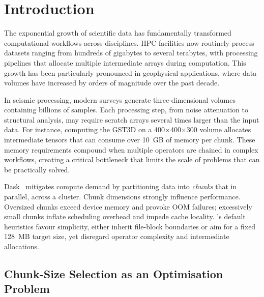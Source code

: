 \section{Introduction}
\label{sec:introduction}

The exponential growth of scientific data has fundamentally transformed computational workflows across disciplines.
\ac{HPC} facilities now routinely process datasets ranging from hundreds of gigabytes to several terabytes, with processing pipelines that allocate multiple intermediate arrays during computation.
This growth has been particularly pronounced in geophysical applications, where data volumes have increased by orders of magnitude over the past decade.

In seismic processing, modern surveys generate three-dimensional volumes containing billions of samples.
Each processing step, from noise attenuation to structural analysis, may require scratch arrays several times larger than the input data.
For instance, computing the \ac{GST3D} on a 400×400×300 volume allocates intermediate tensors that can consume over 10~GB of memory per chunk.
These memory requirements compound when multiple operators are chained in complex workflows, creating a critical bottleneck that limits the scale of problems that can be practically solved.

Dask~\cite{rocklin2015dask} mitigates compute demand by partitioning data into \emph{chunks} that   in parallel, across a cluster.
Chunk dimensions strongly influence performance.
Oversized chunks exceed device memory and provoke \ac{OOM} failures; excessively small chunks inflate scheduling overhead and impede cache locality.
\dask's default heuristics favour simplicity, either inherit file-block boundaries or aim for a fixed 128~MB target size, yet disregard operator complexity and intermediate allocations.


\subsection{Chunk-Size Selection as an Optimisation Problem}

